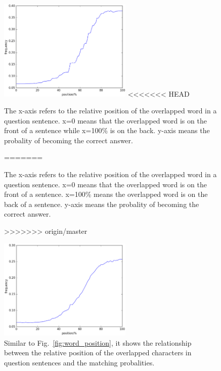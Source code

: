 \documentclass{llncs}
\begin{document}
\begin{table}[!htbp]
\begin{table}[!htbp]
\begin{figure}[htb]
	\begin{minipage}[t]{0.5\linewidth} 
	\subfigure

		\includegraphics[width=2.5in]{figures/word_position.eps}
<<<<<<< HEAD
		\caption{The x-axis refers to the relative position of the overlapped word in a question sentence. x=0 means that the overlapped word is on the front of a sentence  while x=100\% is on the back. y-axis means the probality of becoming the correct answer.}
=======
		\caption{The x-axis refers to the relative position of the overlapped word in a question sentence. x=0 means that the overlapped word is on the front of  a sentence. x=100\% means the overlapped word is on the back of a sentence. y-axis means the probality of becoming the correct answer.}
>>>>>>> origin/master
		\label{fig:word_position}
	\end{minipage}
	\hspace{1ex}  
	\begin{minipage}[t]{0.5\linewidth} 
	\subfigure
	\centering
		\includegraphics[width=2.5in]{figures/character_position.eps}
		\caption{Similar to Fig.~\ref{fig:word_position}, it shows the relationship between the relative position of the overlapped characters in question sentences and the matching probalities.}
		\label{fig:character_position}
	\end{minipage} 
\end{figure}





\end{table}
\end{table}
\end{document}
